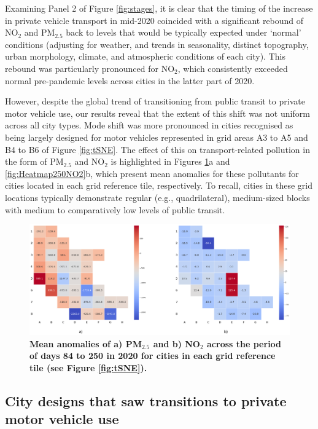\documentclass[preprint,10pt]{elsarticle} %
\begin{document}
Examining Panel 2 of Figure \ref{fig:stages}, it is clear that the timing of the increase in private vehicle transport in mid-2020 coincided with a significant rebound of NO$_{2}$ and PM$_{2.5}$ back to levels that would be typically expected under `normal' conditions (adjusting for weather, and trends in seasonality, distinct topography, urban morphology, climate, and atmospheric conditions of each city\cite{Wijnands2022}). This rebound was particularly pronounced for NO$_{2}$, which consistently exceeded normal pre-pandemic levels across cities in the latter part of 2020.

However, despite the global trend of transitioning from public transit to private motor vehicle use\cite{fernando2023shaping}, our results reveal that the extent of this shift was not uniform across all city types. Mode shift  was more pronounced in cities recognised as being largely designed for motor vehicles\cite{Thompson2020} represented in grid areas A3 to A5 and B4 to B6 of Figure \ref{fig:tSNE}. The effect of this on transport-related pollution in the form of PM$_{2.5}$ and NO$_{2}$ is highlighted in Figures \ref{fig:Heatmap250PM}a and \ref{fig:Heatmap250NO2}b, which present mean anomalies for these pollutants for cities located in each grid reference tile, respectively. To recall, cities in these grid locations typically demonstrate regular (e.g., quadrilateral), medium-sized blocks with medium to comparatively low levels of public transit.

\begin{figure}
\centering
\includegraphics[trim={0 0 0 0},clip,scale=0.25]{Images/pm25Anomaly250_no2Reduction7Ave7Ave250.png}
\caption{\bf Mean anomalies of a) PM$_{2.5}$ and b) NO$_{2}$ across the period of days 84 to 250 in 2020 for cities in each grid reference tile (see Figure \ref{fig:tSNE}).}  
 \label{fig:Heatmap250NO2}\label{fig:Heatmap250PM}
\end{figure}

\subsection*{City designs that saw transitions to private motor vehicle use}
\end{document}
